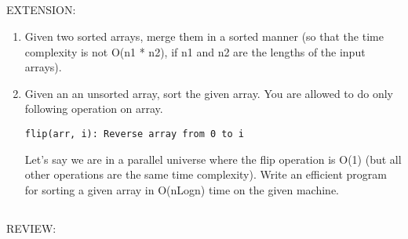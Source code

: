 \documentclass{article}
\begin{document}
\subsection*{}

EXTENSION:

\begin{enumerate}

\item Given two sorted arrays, merge them in a sorted manner (so that the time complexity is not O(n1 * n2), if n1 and n2 are the lengths of the input arrays).

\item Given an an unsorted array, sort the given array. You are allowed to do only following operation on array.

\texttt{flip(arr, i): Reverse array from 0 to i}

Let's say we are in a parallel universe where the flip operation is O(1) (but all other operations are the same time complexity). Write an efficient program for sorting a given array in O(nLogn) time on the given machine. 


\end{enumerate}

\subsection*{}

REVIEW:
\end{document}
